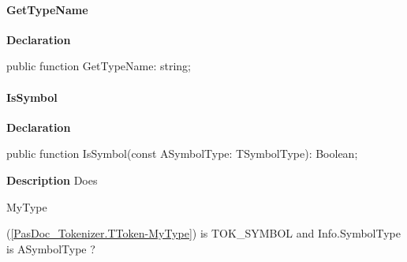\documentclass{report}
\newif\ifpdf
\begin{document}
\paragraph*{GetTypeName}\hspace*{\fill}

\label{PasDoc_Tokenizer.TToken-GetTypeName}
\begin{list}{}{
\setlength{\itemindent}{0cm}
\setlength{\listparindent}{0cm}
\setlength{\leftmargin}{\evensidemargin}
\addtolength{\leftmargin}{\tmplength}
\settowidth{\labelsep}{X}
\addtolength{\leftmargin}{\labelsep}
\setlength{\labelwidth}{\tmplength}
}
\item[\textbf{Declaration}\hfill]
\ifpdf
\begin{flushleft}
\fi
\begin{ttfamily}
public function GetTypeName: string;\end{ttfamily}

\ifpdf
\end{flushleft}
\fi

\end{list}
\paragraph*{IsSymbol}\hspace*{\fill}

\label{PasDoc_Tokenizer.TToken-IsSymbol}
\begin{list}{}{
\setlength{\itemindent}{0cm}
\setlength{\listparindent}{0cm}
\setlength{\leftmargin}{\evensidemargin}
\addtolength{\leftmargin}{\tmplength}
\settowidth{\labelsep}{X}
\addtolength{\leftmargin}{\labelsep}
\setlength{\labelwidth}{\tmplength}
}
\item[\textbf{Declaration}\hfill]
\ifpdf
\begin{flushleft}
\fi
\begin{ttfamily}
public function IsSymbol(const ASymbolType: TSymbolType): Boolean;\end{ttfamily}

\ifpdf
\end{flushleft}
\fi

\par
\item[\textbf{Description}]
Does \begin{ttfamily}MyType\end{ttfamily}(\ref{PasDoc_Tokenizer.TToken-MyType}) is TOK{\_}SYMBOL and Info.SymbolType is ASymbolType ?

\end{list}
\end{document}

